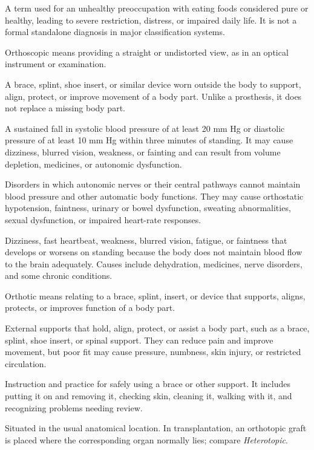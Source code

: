  A term used for an unhealthy preoccupation with eating foods considered pure or healthy, leading to severe restriction, distress, or impaired daily life. It is not a formal standalone diagnosis in major classification systems.

 Orthoscopic means providing a straight or undistorted view, as in an optical instrument or examination.

 A brace, splint, shoe insert, or similar device worn outside the body to support, align, protect, or improve movement of a body part. Unlike a prosthesis, it does not replace a missing body part.

 A sustained fall in systolic blood pressure of at
least 20 mm Hg or diastolic pressure of at least 10 mm Hg within three minutes of
standing. It may cause dizziness, blurred vision, weakness, or fainting and can
result from volume depletion, medicines, or autonomic dysfunction.

 Disorders in which autonomic nerves or their central pathways cannot maintain blood pressure and other automatic body functions. They may cause orthostatic hypotension, faintness, urinary or bowel dysfunction, sweating abnormalities, sexual dysfunction, or impaired heart-rate responses.

 Dizziness, fast heartbeat, weakness, blurred vision, fatigue, or faintness that develops or worsens on standing because the body does not maintain blood flow to the brain adequately. Causes include dehydration, medicines, nerve disorders, and some chronic conditions.

 Orthotic means relating to a brace, splint, insert, or device that supports, aligns, protects, or improves function of a body part.

 External supports that hold, align, protect, or assist a body part, such as a brace, splint, shoe insert, or spinal support. They can reduce pain and improve movement, but poor fit may cause pressure, numbness, skin injury, or restricted circulation.

 Instruction and practice for safely using a brace or other support. It includes putting it on and removing it, checking skin, cleaning it, walking with it, and recognizing problems needing review.

 Situated in the usual anatomical location. In transplantation, an orthotopic graft is placed where the corresponding organ normally lies; compare \textit{Heterotopic}.

